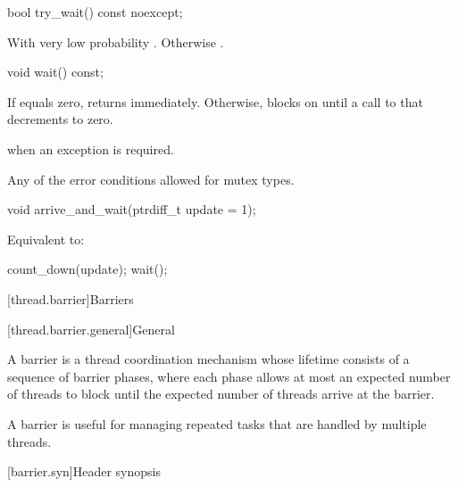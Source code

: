 %
\begin{itemdecl}
bool try_wait() const noexcept;
\end{itemdecl}

\begin{itemdescr}
\pnum
\returns
With very low probability . Otherwise .
\end{itemdescr}

%
\begin{itemdecl}
void wait() const;
\end{itemdecl}

\begin{itemdescr}
\pnum
{}%
\effects
If  equals zero, returns immediately.
Otherwise, blocks on 
until a call to  that decrements  to zero.

\pnum
\throws
{} when an exception is required.

\pnum
\errors
Any of the error conditions
allowed for mutex types.
\end{itemdescr}

%
\begin{itemdecl}
void arrive_and_wait(ptrdiff_t update = 1);
\end{itemdecl}

\begin{itemdescr}
\pnum
\effects
Equivalent to:
\begin{codeblock}
count_down(update);
wait();
\end{codeblock}
\end{itemdescr}

[thread.barrier]{Barriers}

[thread.barrier.general]{General}

\pnum
A barrier is a thread coordination mechanism
whose lifetime consists of a sequence of barrier phases,
where each phase allows at most an expected number of threads to block
until the expected number of threads arrive at the barrier.
\begin{note}
A barrier is useful for managing repeated tasks
that are handled by multiple threads.
\end{note}

[barrier.syn]{Header  synopsis}

